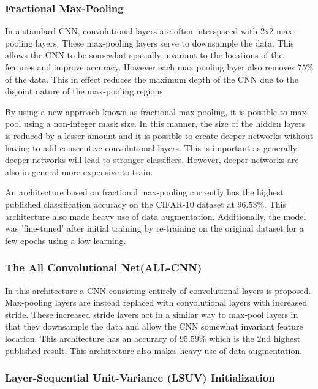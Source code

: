 \subsubsection{Fractional Max-Pooling}

In a standard CNN, convolutional layers are often interspaced with 2x2 max-pooling layers. These max-pooling layers serve to downsample the data. This allows the CNN to be somewhat spatially invariant to the locations of the features and improve accuracy. However each max pooling layer also removes $75\%$ of the data\cite{graham2014fractional}. This in effect reduces the maximum depth of the CNN due to the disjoint nature of the max-pooling regions.

By using a new approach known as fractional max-pooling, it is possible to max-pool using a non-integer mask size. In this manner, the size of the hidden layers is reduced by a lesser amount and it is possible to create deeper networks without having to add consecutive convolutional layers. This is important as generally deeper networks will lead to stronger classifiers\cite{he2016deep}. However, deeper networks are also in general more expensive to train.

An architecture based on fractional max-pooling currently has the highest published classification accuracy on the CIFAR-10 dataset at $96.53\%$. This architecture also made heavy use of data augmentation. Additionally, the model was 'fine-tuned' after initial training by re-training on the original dataset for a few epochs using a low learning.

\subsubsection{The All Convolutional Net(ALL-CNN)}

In this architecture\cite{springenberg2014striving} a CNN consisting entirely of convolutional layers is proposed. Max-pooling layers are instead replaced with convolutional layers with increased stride. These increased stride layers act in a similar way to max-pool layers in that they downsample the data and allow the CNN somewhat invariant feature location. This architecture has an accuracy of $95.59\%$ which is the 2nd highest published result. This architecture also makes heavy use of data augmentation.

\subsubsection{Layer-Sequential Unit-Variance (LSUV) Initialization}
\label{sec:LSUV}

